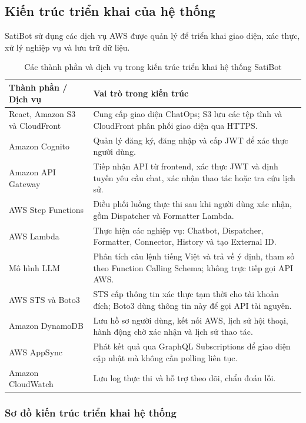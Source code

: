 \documentclass[a4paper,12pt]{article}
\newcommand{\bangfont}{\fontsize{12}{15}\selectfont}
\begin{document}
\subsection{Kiến trúc triển khai của hệ thống}

SatiBot sử dụng các dịch vụ AWS được quản lý để triển khai giao diện, xác thực, xử lý nghiệp vụ và lưu trữ dữ liệu.

\begin{table}[H]
\centering
\caption{Các thành phần và dịch vụ trong kiến trúc triển khai hệ thống SatiBot}
\label{tab:kientruc}
\bangfont
\begin{tabularx}{\linewidth}{@{}>{\raggedright\arraybackslash}p{4.5cm}Y@{}}
\toprule
\textbf{Thành phần / Dịch vụ} & \textbf{Vai trò trong kiến trúc}\\
\midrule
React, Amazon S3 và CloudFront & Cung cấp giao diện ChatOps; S3 lưu các tệp tĩnh và CloudFront phân phối giao diện qua HTTPS.\\
Amazon Cognito & Quản lý đăng ký, đăng nhập và cấp JWT để xác thực người dùng.\\
Amazon API Gateway & Tiếp nhận API từ frontend, xác thực JWT và định tuyến yêu cầu chat, xác nhận thao tác hoặc tra cứu lịch sử.\\
AWS Step Functions & Điều phối luồng thực thi sau khi người dùng xác nhận, gồm Dispatcher và Formatter Lambda.\\
AWS Lambda & Thực hiện các nghiệp vụ: Chatbot, Dispatcher, Formatter, Connector, History và tạo External ID.\\
Mô hình LLM & Phân tích câu lệnh tiếng Việt và trả về ý định, tham số theo Function Calling Schema; không trực tiếp gọi API AWS.\\
AWS STS và Boto3 & STS cấp thông tin xác thực tạm thời cho tài khoản đích; Boto3 dùng thông tin này để gọi API tài nguyên.\\
Amazon DynamoDB & Lưu hồ sơ người dùng, kết nối AWS, lịch sử hội thoại, hành động chờ xác nhận và lịch sử thao tác.\\
AWS AppSync & Phát kết quả qua GraphQL Subscriptions để giao diện cập nhật mà không cần polling liên tục.\\
Amazon CloudWatch & Lưu log thực thi và hỗ trợ theo dõi, chẩn đoán lỗi.\\
\bottomrule
\end{tabularx}
\end{table}

\subsubsection{Sơ đồ kiến trúc triển khai hệ thống}
\end{document}
